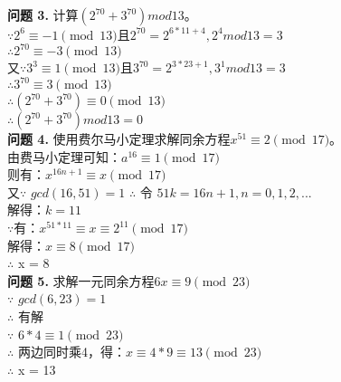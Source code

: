 \documentclass[a4paper]{CINTA}
\begin{document}
\textbf{问题 3.} 计算$(2^{70} + 3^{70}) mod 13$。\\
$\because 2^6 \equiv -1 \pmod{13} 且 2^{70} = 2^{6*11+4},2^{4} mod 13 = 3$ \\
$\therefore 2^{70} \equiv -3 \pmod{13}$ \\
又$\because 3^3 \equiv 1 \pmod{13} 且 3^{70} = 2^{3*23+1},3^{1} mod 13 = 3$ \\
$\therefore 3^{70} \equiv 3 \pmod{13}$ \\
$\therefore (2^{70} + 3^{70}) \equiv 0 \pmod{13}$ \\
$\therefore (2^{70} + 3^{70}) mod 13 = 0$\\

\textbf{问题 4.} 使用费尔马小定理求解同余方程$x^{51} \equiv 2 \pmod{17}$。\\
由费马小定理可知：$a^{16} \equiv 1 \pmod{17}$ \\
则有：$x^{16n+1} \equiv x \pmod{17}$ \\
又$\because$ $gcd(16,51) = 1$
$\therefore$ 令 $51k = 16n+1, n = 0,1,2,...$ \\
解得：$k=11$ \\
$\because$有：$x^{51*11} \equiv x \equiv 2^{11} \pmod{17}$ \\
解得：$x \equiv 8 \pmod{17}$ \\
$\therefore$ x = 8\\

\textbf{问题 5.} 求解一元同余方程$6x \equiv 9 \pmod{23}$ \\
$\because$ $gcd(6,23) = 1$ \\
$\therefore$ 有解 \\
$\because$ $6*4 \equiv 1 \pmod{23}$ \\
$\therefore$ 两边同时乘4，得：$x \equiv 4*9 \equiv 13 \pmod{23}$ \\
$\therefore$ x = 13\\ 
\end{document}
